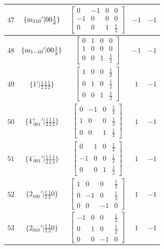 \documentclass[fleqn,8pt]{jsarticle}
\begin{document}
\begin{longtable}{ccccc}
$ 47 $ & $ \{{\rm m}_{110}{}'|0 0 \frac{1}{2}\} $ & $ \begin{bmatrix} 0 & -1 & 0 & 0 \\ -1 & 0 & 0 & 0 \\ 0 & 0 & 1 & \frac{1}{2} \end{bmatrix} $ & $ -1 $ & $ -1 $ \\ \hline
$ 48 $ & $ \{{\rm m}_{1-10}{}'|0 0 \frac{1}{2}\} $ & $ \begin{bmatrix} 0 & 1 & 0 & 0 \\ 1 & 0 & 0 & 0 \\ 0 & 0 & 1 & \frac{1}{2} \end{bmatrix} $ & $ -1 $ & $ -1 $ \\ \hline
$ 49 $ & $ \{1{}'|\frac{1}{2} \frac{1}{2} \frac{1}{2}\} $ & $ \begin{bmatrix} 1 & 0 & 0 & \frac{1}{2} \\ 0 & 1 & 0 & \frac{1}{2} \\ 0 & 0 & 1 & \frac{1}{2} \end{bmatrix} $ & $ 1 $ & $ -1 $ \\ \hline
$ 50 $ & $ \{4^{+}_{\,\,001}{}'|\frac{1}{2} \frac{1}{2} \frac{1}{2}\} $ & $ \begin{bmatrix} 0 & -1 & 0 & \frac{1}{2} \\ 1 & 0 & 0 & \frac{1}{2} \\ 0 & 0 & 1 & \frac{1}{2} \end{bmatrix} $ & $ 1 $ & $ -1 $ \\ \hline
$ 51 $ & $ \{4^{-}_{\,\,001}{}'|\frac{1}{2} \frac{1}{2} \frac{1}{2}\} $ & $ \begin{bmatrix} 0 & 1 & 0 & \frac{1}{2} \\ -1 & 0 & 0 & \frac{1}{2} \\ 0 & 0 & 1 & \frac{1}{2} \end{bmatrix} $ & $ 1 $ & $ -1 $ \\ \hline
$ 52 $ & $ \{2{}_{100}{}'|\frac{1}{2} \frac{1}{2} 0\} $ & $ \begin{bmatrix} 1 & 0 & 0 & \frac{1}{2} \\ 0 & -1 & 0 & \frac{1}{2} \\ 0 & 0 & -1 & 0 \end{bmatrix} $ & $ 1 $ & $ -1 $ \\ \hline
$ 53 $ & $ \{2{}_{010}{}'|\frac{1}{2} \frac{1}{2} 0\} $ & $ \begin{bmatrix} -1 & 0 & 0 & \frac{1}{2} \\ 0 & 1 & 0 & \frac{1}{2} \\ 0 & 0 & -1 & 0 \end{bmatrix} $ & $ 1 $ & $ -1 $ \\ \hline

\end{longtable}
\end{document}
